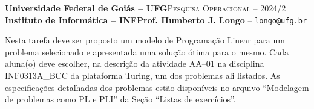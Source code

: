 \documentclass[12pt]{article}
\begin{document}
 \begin{tcolorbox}[rounded corners, colback=blue!3, colframe=blue!40!black]
  \footnotesize\textbf{Universidade Federal de Goiás -- UFG}\hfill \textsc{Pesquisa Operacional -- 2024/2}\\
  \footnotesize\textbf{Instituto de Informática -- INF\hfill Prof. Humberto J. Longo} -- \scriptsize\texttt{longo@ufg.br}
 \end{tcolorbox}\bigskip
%
\begin{tcolorbox}[rounded corners, colback=blue!3, colframe=blue!40!black, title=\textbf{Atividade AA-01 : \discente\ (\matricula)}]
 Nesta tarefa deve ser proposto um modelo de Programação Linear para um problema selecionado e apresentada uma solução ótima para o mesmo. Cada aluna(o) deve escolher, na descrição da atividade AA--01 na disciplina INF0313A\_BCC da plataforma Turing, um dos problemas ali listados. As especificações detalhadas dos problemas estão disponíveis no arquivo ``Modelagem de problemas como PL e PLI'' da Seção ``Listas de exercícios''.
\end{tcolorbox}\bigskip
\end{document}
